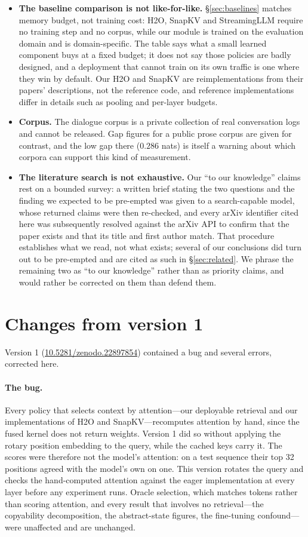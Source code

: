 \documentclass[11pt]{article}
\begin{document}
\begin{itemize}
\item \textbf{The baseline comparison is not like-for-like.}
\S\ref{sec:baselines} matches memory budget, not training cost: H2O, SnapKV and
StreamingLLM require no training step and no corpus, while our module is trained
on the evaluation domain and is domain-specific. The table says what a small
learned component buys at a fixed budget; it does not say those policies are
badly designed, and a deployment that cannot train on its own traffic is one
where they win by default. Our H2O and SnapKV are reimplementations from their
papers' descriptions, not the reference code, and reference implementations
differ in details such as pooling and per-layer budgets.
\item \textbf{Corpus.} The dialogue corpus is a private collection of real
conversation logs and cannot be released. Gap figures for a public prose corpus
are given for contrast, and the low gap there ($0.286$ nats) is itself a warning
about which corpora can support this kind of measurement.
\item \textbf{The literature search is not exhaustive.} Our ``to our knowledge''
claims rest on a bounded survey: a written brief stating the two questions and
the finding we expected to be pre-empted was given to a search-capable model,
whose returned claims were then re-checked, and every arXiv identifier cited here
was subsequently resolved against the arXiv API to confirm that the paper exists
and that its title and first author match. That procedure establishes what we
read, not what exists; several of our conclusions did turn out to be
pre-empted and are cited as such in \S\ref{sec:related}. We phrase the remaining
two as ``to our knowledge'' rather than as priority claims, and would rather be
corrected on them than defend them.
\end{itemize}

\section*{Changes from version 1}

Version 1 (\href{https://doi.org/10.5281/zenodo.22897854}{10.5281/zenodo.22897854})
contained a bug and several errors, corrected here.

\paragraph{The bug.} Every policy that selects context by attention---our
deployable retrieval and our implementations of H2O and SnapKV---recomputes
attention by hand, since the fused kernel does not return weights. Version 1 did
so without applying the rotary position embedding to the query, while the cached
keys carry it. The scores were therefore not the model's attention: on a test
sequence their top 32 positions agreed with the model's own on one. This version
rotates the query and checks the hand-computed attention against the eager
implementation at every layer before any experiment runs. Oracle selection, which
matches tokens rather than scoring attention, and every result that involves no
retrieval---the copyability decomposition, the abstract-state figures, the
fine-tuning confound---were unaffected and are unchanged.
\end{document}

